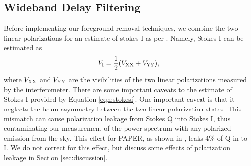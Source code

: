 \documentclass[twocolumn,numberedappendix]{emulateapj} \shorttitle{New Limits on the 21 cm Power Spectrum at $z=8.4$}
\begin{document}
%
%



\subsection{Wideband Delay Filtering}\label{sec:wbd_filtering}


Before implementing our foreground removal techniques, we combine the two
linear polarizations for an estimate of stokes I as per \citet{moore_et_al2013}.
Namely, Stokes I can be estimated as 
\begin{equation}\label{eqn:stokesi}
    V_{\rm I} = \frac12(V_{\rm XX}+V_{\rm YY}),
\end{equation}
where $V_{\rm XX}$ and $V_{\rm YY}$ are the visibilities of the two linear
polarizations measured by the interferometer. There are some important caveats
to the estimate of Stokes I provided by Equation \eqref{eqn:stokesi}. One
important caveat is that it neglects the beam asymmetry  between the two linear
polarization states. This mismatch can cause polarization leakage from Stokes
Q into Stokes I, thus contaminating  our measurement of the power spectrum with any polarized emission from the sky.
This effect for PAPER, as shown in \citet{moore_et_al2013}, leaks 4\% of Q in to
I.  We do not correct for this effect, but discuss some effects of 
polarization leakage in Section \ref{sec:discussion}. 
\end{document}
